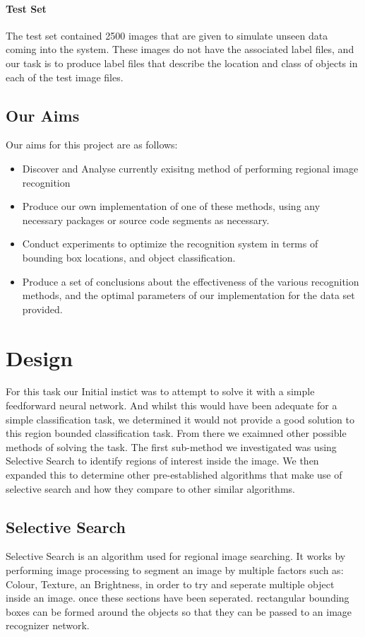 \documentclass[10pt]{article}
\begin{document}
\paragraph{Test Set}
The test set contained 2500 images that are given to simulate unseen data coming into the system. These images do not have the associated label files, and our task is to produce label files that describe the location and class of objects in each of the test image files.

\subsection{Our Aims}
Our aims for this project are as follows:
\begin{itemize}
	\item Discover and Analyse currently exisitng method of performing regional image recognition
	\item Produce our own implementation of one of these methods, using any necessary packages or source code segments as necessary.
	\item Conduct experiments to optimize the recognition system in terms of bounding box locations, and object classification.
	\item Produce a set of conclusions about the effectiveness of the various recognition methods, and the optimal parameters of our implementation for the data set provided.
\end {itemize}

\section{Design}
For this task our Initial instict was to attempt to solve it with a simple feedforward neural network. And whilst this would have been adequate for a simple classification task, we determined it would not provide a good solution to this region bounded classification task. From there we exaimned other possible methods of solving the task. The first sub-method we investigated was using Selective Search to identify regions of interest inside the image. We then expanded this to determine other pre-established algorithms that make use of selective search and how they compare to other similar algorithms.

\subsection{Selective Search}
Selective Search is an algorithm used for regional image searching. It works by performing image processing to segment an image by multiple factors such as: Colour, Texture, an Brightness, in order to try and seperate multiple object inside an image. once these sections have been seperated. rectangular bounding boxes can be formed around the objects so that they can be passed to an image recognizer network.
	
\end{document}
